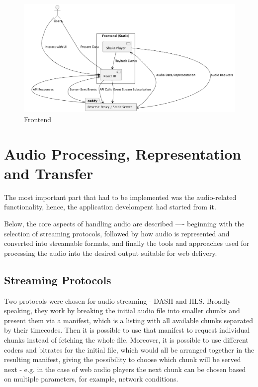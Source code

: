\begin{figure}[htbp]
    \centering
    \includegraphics[width=1\textwidth, keepaspectratio]{diagrams/frontend.png}
    \caption{Frontend}
    \label{fig:Frontend}
\end{figure}


\section{Audio Processing, Representation and Transfer}
The most important part that had to be implemented was the audio-related functionality, hence, the application develompent
had started from it.

Below, the core aspects of handling audio are described —-
beginning with the selection of streaming protocols,
followed by how audio is represented and converted into streamable formats,
and finally the tools and approaches used for processing the audio into the desired
output suitable for web delivery.

\subsection{Streaming Protocols}
Two protocols were chosen for audio streaming - DASH\cite{dash} and HLS\cite{hls}.
Broadly speaking, they work by breaking the initial audio file into smaller chunks and present them via a manifest,
which is a listing with all available chunks separated by their timecodes. Then it is possible to use that manifest
to request individual chunks instead of fetching the whole file. Moreover, it is possible to use
different coders and bitrates for the initial file, which would all be arranged together in the resulting manifest, giving
the possibility to choose which chunk will be served next - e.g. in the case of web audio players the next chunk can
be chosen based on multiple parameters, for example, network conditions.

